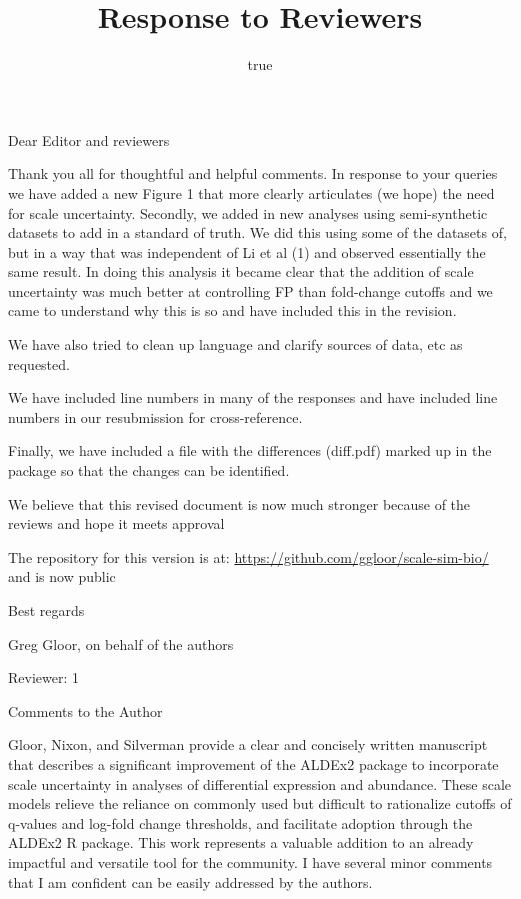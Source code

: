 \documentclass[
]{article}
\title{Response to Reviewers}
\author{true}
\date{}
\begin{document}
\maketitle

Dear Editor and reviewers

Thank you all for thoughtful and helpful comments. In response to your
queries we have added a new Figure 1 that more clearly articulates (we
hope) the need for scale uncertainty. Secondly, we added in new analyses
using semi-synthetic datasets to add in a standard of truth. We did this
using some of the datasets of, but in a way that was independent of Li
et al (1) and observed essentially the same result. In doing this
analysis it became clear that the addition of scale uncertainty was much
better at controlling FP than fold-change cutoffs and we came to
understand why this is so and have included this in the revision.

We have also tried to clean up language and clarify sources of data, etc
as requested.

We have included line numbers in many of the responses and have included
line numbers in our resubmission for cross-reference.

Finally, we have included a file with the differences (diff.pdf) marked
up in the package so that the changes can be identified.

We believe that this revised document is now much stronger because of
the reviews and hope it meets approval

The repository for this version is at:
\url{https://github.com/ggloor/scale-sim-bio/} and is now public

Best regards

Greg Gloor, on behalf of the authors

Reviewer: 1

Comments to the Author

Gloor, Nixon, and Silverman provide a clear and concisely written
manuscript that describes a significant improvement of the ALDEx2
package to incorporate scale uncertainty in analyses of differential
expression and abundance. These scale models relieve the reliance on
commonly used but difficult to rationalize cutoffs of q-values and
log-fold change thresholds, and facilitate adoption through the ALDEx2 R
package. This work represents a valuable addition to an already
impactful and versatile tool for the community. I have several minor
comments that I am confident can be easily addressed by the authors.
\end{document}
